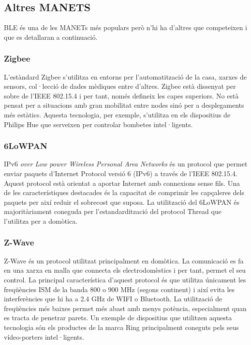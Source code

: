 \subsection{Altres MANETS}
BLE és una de les MANETs més populars però n'hi ha d'altres que competeixen i que es detallaran a continuació.

\subsubsection{Zigbee}
L'estàndard Zigbee s'utilitza en entorns per l'automatització de la casa, xarxes de sensors, col·lecció de dades mèdiques entre d'altres.
Zigbee està dissenyat per sobre de l'IEEE 802.15.4\footnotemark{} i per tant, només defineix les capes superiors.
No està pensat per a situacions amb gran mobilitat entre nodes sinó per a desplegaments més estàtics.
Aquesta tecnologia, per exemple, s'utilitza en els dispositius de Philips Hue que serveixen per controlar bombetes intel·ligents.

\subsubsection{6LoWPAN}
IPv6 \textit{over Low power Wireless Personal Area Networks} és un protocol que permet enviar paquets d'Internet Protocol versió 6 (IPv6) a través de l'IEEE 802.15.4\footnotemark[\value{footnote}].
Aquest protocol està orientat a aportar Internet amb connexions sense fils.
Una de les característiques destacades és la capacitat de comprimir les capçaleres dels paquets per així reduir el sobrecost que suposa.
La utilització del 6LoWPAN és majoritàriament coneguda per l'estandardització del protocol Thread que l'utilitza per a domòtica.


\subsubsection{Z-Wave}
Z-Wave és un protocol utilitzat principalment en domòtica. La comunicació es fa en una xarxa en malla que connecta els electrodomèstics i per tant, permet el seu control.
La principal característica d'aquest protocol és que utilitza únicament les freqüències ISM de la banda 800 o 900 MHz (segons continent) i així evita les interferències que hi ha a 2.4 GHz de WIFI o Bluetooth.
La utilització de freqüències més baixes permet més abast amb menys potència, especialment quan es tracta de penetrar parets.
Un exemple de dispositius que utilitzen aquesta tecnologia són els productes de la marca Ring principalment coneguts pels seus vídeo-porters intel·ligents.

